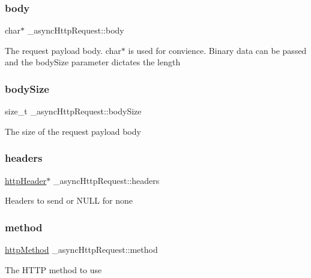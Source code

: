 \subsubsection{\texorpdfstring{body}{body}}
{\footnotesize\ttfamily char$\ast$ \+\_\+async\+Http\+Request\+::body}

The request payload body. char$\ast$ is used for convience. Binary data can be passed and the body\+Size parameter dictates the length \mbox{\label{struct__asyncHttpRequest_a75d8c04d93312ca23e60ad4b48903cc3}} 
\subsubsection{\texorpdfstring{body\+Size}{bodySize}}
{\footnotesize\ttfamily size\+\_\+t \+\_\+async\+Http\+Request\+::body\+Size}

The size of the request payload body \mbox{\label{struct__asyncHttpRequest_a9c9afff85d7852ab125cb1a8ecee5a06}} 
\subsubsection{\texorpdfstring{headers}{headers}}
{\footnotesize\ttfamily \hyperlink{redfishRawAsync_8h_a3ee36950587f4749a62b080e3e157280}{http\+Header}$\ast$ \+\_\+async\+Http\+Request\+::headers}

Headers to send or N\+U\+LL for none \mbox{\label{struct__asyncHttpRequest_a43ee659ce0011d76e6e06af3a02f7ee2}} 
\subsubsection{\texorpdfstring{method}{method}}
{\footnotesize\ttfamily \hyperlink{redfishRawAsync_8h_a15f26ab1ae1b376c50b78e58ded397be}{http\+Method} \+\_\+async\+Http\+Request\+::method}

The H\+T\+TP method to use \mbox{\label{struct__asyncHttpRequest_a471f8b6fb269a1efc9f79c6dd530ed69}} 
